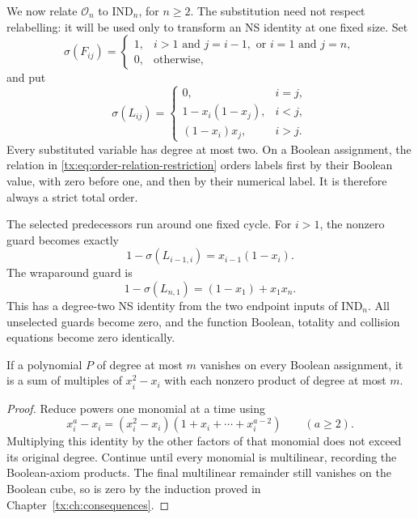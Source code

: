 We now relate $\mathcal O_n$ to $\mathrm{IND}_n$, for $n\ge2$.
The substitution need not respect relabelling: it will be used only
to transform an NS identity at one fixed size. Set
\begin{equation}\label{tx:eq:order-cycle-restriction}
 \sigma(F_{ij})=
 \begin{cases}
 1,&i>1\text{ and }j=i-1,\text{ or }i=1\text{ and }j=n,\\
 0,&\text{otherwise},
 \end{cases}
\end{equation}
and put
\begin{equation}\label{tx:eq:order-relation-restriction}
 \sigma(L_{ij})=
 \begin{cases}
 0,&i=j,\\
 1-x_i(1-x_j),&i<j,\\
 (1-x_i)x_j,&i>j.
 \end{cases}
\end{equation}
Every substituted variable has degree at most two. On a Boolean
assignment, the relation in \eqref{tx:eq:order-relation-restriction}
orders labels first by their Boolean value, with zero before one,
and then by their numerical label. It is therefore always a strict
total order.

The selected predecessors run around one fixed cycle. For $i>1$,
the nonzero guard becomes exactly
\[
            1-\sigma(L_{i-1,i})=x_{i-1}(1-x_i).
\]
The wraparound guard is
\begin{equation}\label{tx:eq:order-wrap-guard}
       1-\sigma(L_{n,1})=(1-x_1)+x_1x_n.
\end{equation}
This has a degree-two NS identity from the two endpoint inputs of
$\mathrm{IND}_n$. All unselected guards become zero, and the function
Boolean, totality and collision equations become zero identically.

\begin{lemma}
\label{tx:lem:order-Boolean-reduction}
If a polynomial $P$ of degree at most $m$ vanishes on every Boolean
assignment, it is a sum of multiples of $x_i^2-x_i$ with each nonzero
product of degree at most $m$.
\end{lemma}
\begin{proof}
Reduce powers one monomial at a time using
\[
 x_i^a-x_i=(x_i^2-x_i)(1+x_i+\cdots+x_i^{a-2})\qquad(a\ge2).
\]
Multiplying this identity by the other factors of that monomial
does not exceed its original degree. Continue until every monomial
is multilinear, recording the Boolean-axiom products. The final
multilinear remainder still vanishes on the Boolean cube, so is zero
by the induction proved in Chapter~\ref{tx:ch:consequences}.
\end{proof}

